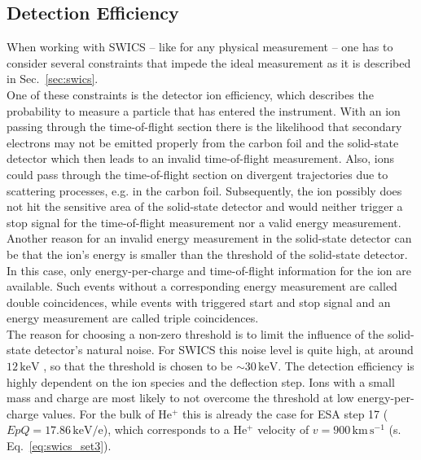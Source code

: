 \subsection{Detection Efficiency}
\label{subsec:det_eff}
When working with SWICS -- like for any physical measurement -- one has to consider several constraints that impede the ideal measurement as it is described in Sec.~\ref{sec:swics}. \\
One of these constraints is the detector ion efficiency, which describes the probability to measure a particle that has entered the instrument. 
With an ion passing through the time-of-flight section there is the likelihood that secondary electrons may not be emitted properly from the carbon foil and the solid-state detector which then leads to an invalid time-of-flight measurement. Also, ions could pass through the time-of-flight section on divergent trajectories due to scattering processes, e.g. in the carbon foil. Subsequently, the ion possibly does not hit the sensitive area of the solid-state detector and would neither trigger a stop signal for the time-of-flight measurement nor a valid energy measurement.\\
Another reason for an invalid energy measurement in the solid-state detector can be that the ion's energy is smaller than the threshold of the solid-state detector. In this case, only energy-per-charge and time-of-flight information for the ion are available. Such events without a corresponding energy measurement are called double coincidences, while events with triggered start and stop signal and an energy measurement are called triple coincidences.\\
The reason for choosing a non-zero threshold is to limit the influence of the solid-state detector's natural noise. For SWICS this noise level is quite high, at around $12\,\mathrm{keV}$ \citep{gloeckler_1992}, so that the threshold is chosen to be $\sim 30 \, \mathrm{keV}$. 
The detection efficiency is highly dependent on the ion species and the deflection step.
Ions with a small mass and charge are most likely to not overcome the threshold at low energy-per-charge values. For the bulk of $\mathrm{He^{+}}$ this is already the case for ESA step 17 ($EpQ = 17.86\,\mathrm{keV/e}$), which corresponds to a $\mathrm{He^{+}}$ velocity of $v = 900\,\mathrm{km\,s^{-1}}$ (s. Eq.~\ref{eq:swics_set3}).\\
